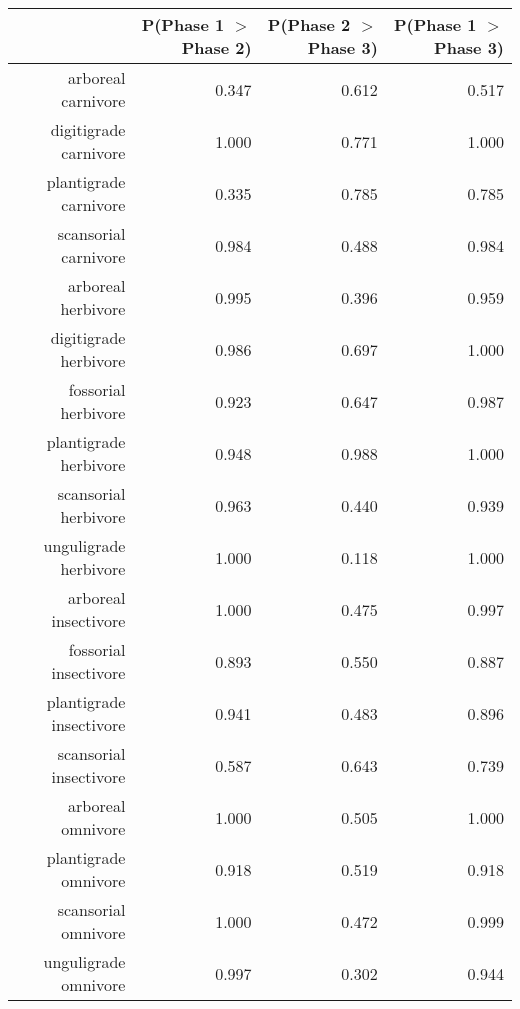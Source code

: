 \begin{table}[ht]
\centering
\begin{tabular}{rrrr}
  \hline
 & P(Phase 1 $>$ Phase 2) & P(Phase 2 $>$ Phase 3) & P(Phase 1 $>$ Phase 3) \\ 
  \hline
arboreal carnivore & 0.347 & 0.612 & 0.517 \\ 
  digitigrade carnivore & 1.000 & 0.771 & 1.000 \\ 
  plantigrade carnivore & 0.335 & 0.785 & 0.785 \\ 
  scansorial carnivore & 0.984 & 0.488 & 0.984 \\ 
  arboreal herbivore & 0.995 & 0.396 & 0.959 \\ 
  digitigrade herbivore & 0.986 & 0.697 & 1.000 \\ 
  fossorial herbivore & 0.923 & 0.647 & 0.987 \\ 
  plantigrade herbivore & 0.948 & 0.988 & 1.000 \\ 
  scansorial herbivore & 0.963 & 0.440 & 0.939 \\ 
  unguligrade herbivore & 1.000 & 0.118 & 1.000 \\ 
  arboreal insectivore & 1.000 & 0.475 & 0.997 \\ 
  fossorial insectivore & 0.893 & 0.550 & 0.887 \\ 
  plantigrade insectivore & 0.941 & 0.483 & 0.896 \\ 
  scansorial insectivore & 0.587 & 0.643 & 0.739 \\ 
  arboreal omnivore & 1.000 & 0.505 & 1.000 \\ 
  plantigrade omnivore & 0.918 & 0.519 & 0.918 \\ 
  scansorial omnivore & 1.000 & 0.472 & 0.999 \\ 
  unguligrade omnivore & 0.997 & 0.302 & 0.944 \\ 
   \hline
\end{tabular}
\label{tab:origin_plant}
\end{table}
